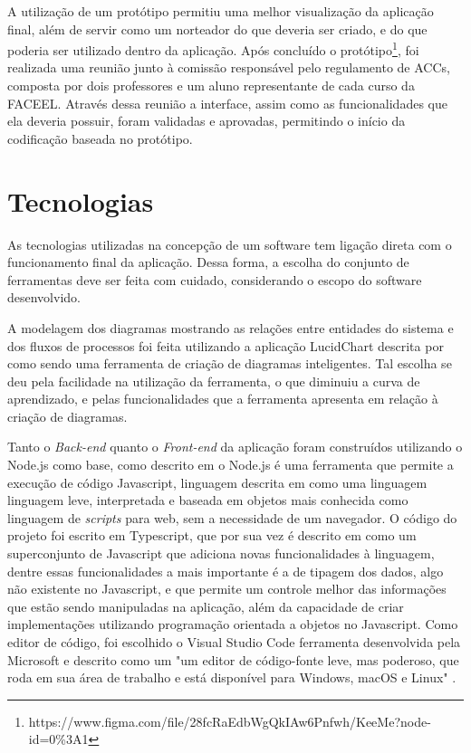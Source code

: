 A utilização de um protótipo permitiu uma melhor visualização da aplicação final, além de servir como um norteador do que deveria ser criado, e do que poderia ser utilizado dentro da aplicação. Após concluído o protótipo\footnote[1]{https://www.figma.com/file/28fcRaEdbWgQkIAw6Pnfwh/KeeMe?node-id=0\%3A1}, foi realizada uma reunião junto à comissão responsável pelo regulamento de ACCs, composta por dois professores e um aluno representante de cada curso da FACEEL. Através dessa reunião a interface, assim como as funcionalidades que ela deveria possuir, foram validadas e aprovadas, permitindo o início da codificação baseada no protótipo.

\section{Tecnologias}
\label{sec:tecnologias}

As tecnologias utilizadas na concepção de um software tem ligação direta com o funcionamento final da aplicação. Dessa forma, a escolha do conjunto de ferramentas deve ser feita com cuidado, considerando o escopo do software desenvolvido.

A modelagem dos diagramas mostrando as relações entre entidades do sistema e dos fluxos de processos foi feita utilizando a aplicação LucidChart descrita por \cite{lucidchart} como sendo uma ferramenta de criação de diagramas inteligentes. Tal escolha se deu pela facilidade na utilização da ferramenta, o que diminuiu a curva de aprendizado, e pelas funcionalidades que a ferramenta apresenta em relação à criação de diagramas.

Tanto o \textit{Back-end} quanto o \textit{Front-end} da aplicação foram construídos utilizando o Node.js como base, como descrito em \cite{node} o Node.js é uma ferramenta que permite a execução de código Javascript, linguagem descrita em \cite{javascript} como uma linguagem linguagem leve, interpretada e baseada em objetos mais conhecida como linguagem de \textit{scripts} para web, sem a necessidade de um navegador. O código do projeto foi escrito em Typescript, que por sua vez é descrito em \cite{typescript} como um superconjunto de Javascript que adiciona novas funcionalidades à linguagem, dentre essas funcionalidades a mais importante é a de tipagem dos dados, algo não existente no Javascript, e que permite um controle melhor das informações que estão sendo manipuladas na aplicação, além da capacidade de criar implementações utilizando programação orientada a objetos no Javascript. Como editor de código, foi escolhido o Visual Studio Code ferramenta desenvolvida pela Microsoft e descrito como um "um editor de código-fonte leve, mas poderoso, que roda em sua área de trabalho e está disponível para Windows, macOS e Linux" \cite{visualstudiocode}.

